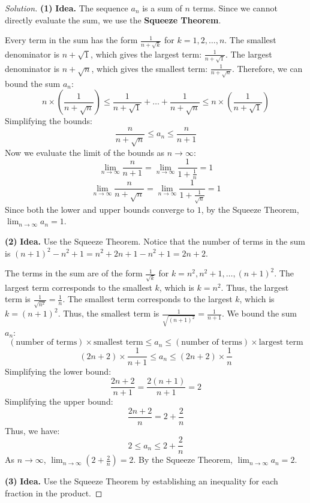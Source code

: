 \documentclass[11pt]{article}
\theoremstyle{definition}
\newenvironment{solution}{\begin{proof}[Solution]}{\end{proof}}
\begin{document}
\begin{solution}
\textbf{(1)} \textbf{Idea.} The sequence $a_n$ is a sum of $n$ terms. Since we cannot directly evaluate the sum, we use the \textbf{Squeeze Theorem}. 

Every term in the sum has the form $\frac{1}{n+\sqrt{k}}$ for $k=1, 2, \dots, n$.
The smallest denominator is $n+\sqrt{1}$, which gives the largest term: $\frac{1}{n+\sqrt{1}}$.
The largest denominator is $n+\sqrt{n}$, which gives the smallest term: $\frac{1}{n+\sqrt{n}}$.
Therefore, we can bound the sum $a_n$:
\[
n \times \left( \frac{1}{n+\sqrt{n}} \right) \le \frac{1}{n+\sqrt{1}} + \dots + \frac{1}{n+\sqrt{n}} \le n \times \left( \frac{1}{n+\sqrt{1}} \right)
\]
Simplifying the bounds:
\[
\frac{n}{n+\sqrt{n}} \le a_n \le \frac{n}{n+1}
\]
Now we evaluate the limit of the bounds as $n \to \infty$:
\[
\lim_{n \to \infty} \frac{n}{n+1} = \lim_{n \to \infty} \frac{1}{1 + \frac{1}{n}} = 1
\]
\[
\lim_{n \to \infty} \frac{n}{n+\sqrt{n}} = \lim_{n \to \infty} \frac{1}{1 + \frac{1}{\sqrt{n}}} = 1
\]
Since both the lower and upper bounds converge to $1$, by the Squeeze Theorem, $\lim_{n \to \infty} a_n = 1$.

\textbf{(2)} \textbf{Idea.} Use the Squeeze Theorem. Notice that the number of terms in the sum is $(n+1)^2 - n^2 + 1 = n^2 + 2n + 1 - n^2 + 1 = 2n + 2$.

The terms in the sum are of the form $\frac{1}{\sqrt{k}}$ for $k = n^2, n^2+1, \dots, (n+1)^2$.
The largest term corresponds to the smallest $k$, which is $k=n^2$. Thus, the largest term is $\frac{1}{\sqrt{n^2}} = \frac{1}{n}$.
The smallest term corresponds to the largest $k$, which is $k=(n+1)^2$. Thus, the smallest term is $\frac{1}{\sqrt{(n+1)^2}} = \frac{1}{n+1}$.
We bound the sum $a_n$:
\[
(\text{number of terms}) \times \text{smallest term} \le a_n \le (\text{number of terms}) \times \text{largest term}
\]
\[
(2n+2) \times \frac{1}{n+1} \le a_n \le (2n+2) \times \frac{1}{n}
\]
Simplifying the lower bound:
\[
\frac{2n+2}{n+1} = \frac{2(n+1)}{n+1} = 2
\]
Simplifying the upper bound:
\[
\frac{2n+2}{n} = 2 + \frac{2}{n}
\]
Thus, we have:
\[
2 \le a_n \le 2 + \frac{2}{n}
\]
As $n \to \infty$, $\lim_{n \to \infty} \left( 2 + \frac{2}{n} \right) = 2$.
By the Squeeze Theorem, $\lim_{n \to \infty} a_n = 2$.

\textbf{(3)} \textbf{Idea.} Use the Squeeze Theorem by establishing an inequality for each fraction in the product.


\end{solution}
\end{document}
